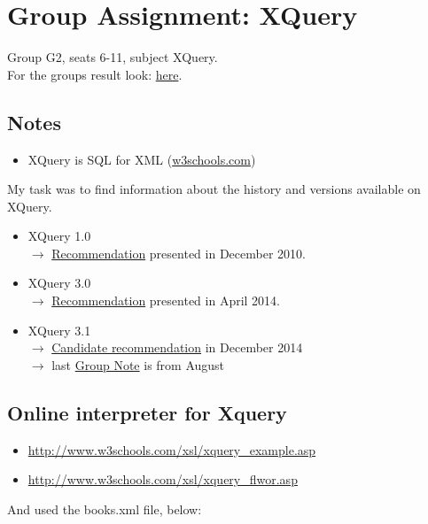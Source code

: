 \documentclass{report}
\begin{document}
\section{Group Assignment: XQuery}
 Group G2, seats 6-11, subject XQuery.\\
 For the groups result look: \href{https://www.os3.nl/2015-2016/students/jeroen_van_prooijen/es/week36/g2_exercise_xquery}{here}.

\subsection{Notes}
\begin{itemize}
\item XQuery is SQL for XML (\url{w3schools.com})
\end{itemize}

My task was to find information about the history and versions available on XQuery.

\begin{itemize}
\item XQuery 1.0 \hfill \\
$\rightarrow$ \href{http://www.w3.org/TR/xquery/}{Recommendation} presented in December 2010.
\item XQuery 3.0 \hfill \\
$\rightarrow$ \href{http://www.w3.org/TR/xquery-30/}{Recommendation} presented in April 2014.
\item XQuery 3.1 \hfill \\
$\rightarrow$ \href{http://www.w3.org/TR/xquery-3/}{Candidate recommendation} in December 2014 \\ 
$\rightarrow$ last \href{http://www.w3.org/TR/xquery-31-requirements/}{Group Note} is from August
\end{itemize}

\subsection{Online interpreter for Xquery}
\begin{itemize}
\item \url{http://www.w3schools.com/xsl/xquery_example.asp}
\item \url{http://www.w3schools.com/xsl/xquery_flwor.asp}
\end{itemize}

And used the books.xml file, below: 
\end{document}
